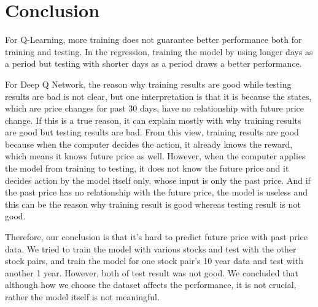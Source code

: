 \chapter{Conclusion}
\label{Ch:conclusion}

For Q-Learning, more training does not guarantee better performance both for training and testing. In the regression, training the model by using longer days as a period but testing with shorter days as a period draws a better performance. 

For Deep Q Network, the reason why training results are good while testing results are bad is not clear, but one interpretation is that it is because the states, which are price changes for past 30 days, have no relationship with future price change. If this is a true reason, it can explain mostly with why training results are good but testing results are bad. From this view, training results are good because when the computer decides the action, it already knows the reward, which means it knows future price as well. However, when the computer applies the model from training to testing, it does not know the future price and it decides action by the model itself only, whose input is only the past price. And if the past price has no relationship with the future price, the model is useless and this can be the reason why training result is good whereas testing result is not good. 

Therefore, our conclusion is that it’s hard to predict future price with past price data. We tried to train the model with various stocks and test with the other stock pairs, and train the model for one stock pair’s 10 year data and test with another 1 year. However, both of test result was not good. We concluded that although how we choose the dataset affects the performance, it is not crucial, rather the model itself is not meaningful. 

